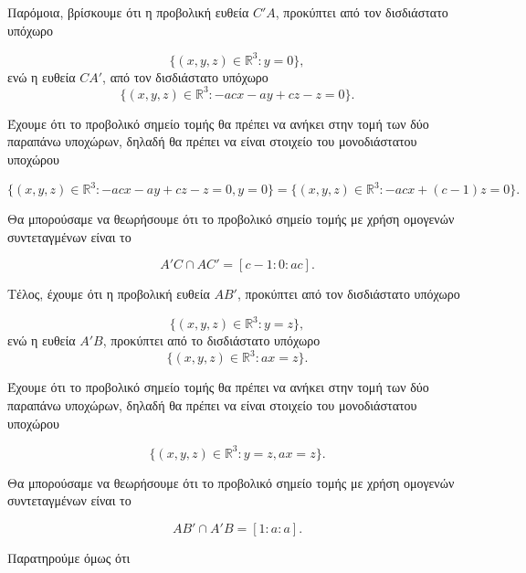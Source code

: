\documentclass[12pt, a4paper]{book}
\begin{document}
Παρόμοια, βρίσκουμε ότι η προβολική ευθεία $C'A$, προκύπτει από τον δισδιάστατο υπόχωρο

\begin{displaymath}
\{(x,y,z)\in \mathbb{R}^3: y=0\},
\end{displaymath}
ενώ η ευθεία $CA'$, από τον δισδιάστατο υπόχωρο
\begin{displaymath}
\{(x,y,z)\in \mathbb{R}^3: -acx-ay+cz-z =0\}.
\end{displaymath}

Έχουμε ότι το προβολικό σημείο τομής θα πρέπει να ανήκει στην τομή των δύο παραπάνω υποχώρων, δηλαδή θα πρέπει να είναι στοιχείο του μονοδιάστατου υποχώρου

\begin{displaymath}
\{(x,y,z)\in \mathbb{R}^3: -acx-ay+cz-z =0, y=0\}=\{(x,y,z)\in \mathbb{R}^3: -acx +(c-1)z =0\}.
\end{displaymath}

Θα μπορούσαμε να θεωρήσουμε ότι το προβολικό σημείο τομής με χρήση  ομογενών συντεταγμένων είναι το 

\begin{displaymath}
A'C \cap AC' = [c-1:0:ac].
\end{displaymath}

Τέλος, έχουμε ότι η προβολική ευθεία $ΑΒ'$, προκύπτει από τον δισδιάστατο υπόχωρο

\begin{displaymath}
\{(x,y,z)\in \mathbb{R}^3:y=z\},
\end{displaymath}
ενώ η ευθεία $A'B$, προκύπτει από το δισδιάστατο υπόχωρο 
\begin{displaymath}
\{(x,y,z)\in \mathbb{R}^3: ax=z\}.
\end{displaymath}

Έχουμε ότι το προβολικό σημείο τομής θα πρέπει να ανήκει στην τομή των δύο παραπάνω υποχώρων, δηλαδή θα πρέπει να είναι στοιχείο του μονοδιάστατου υποχώρου

\begin{displaymath}
\{(x,y,z)\in \mathbb{R}^3:y=z, ax=z\}.
\end{displaymath}

Θα μπορούσαμε να θεωρήσουμε ότι το προβολικό σημείο τομής με χρήση ομογενών συντεταγμένων είναι το 

\begin{displaymath}
AB' \cap A'B = [1:a:a].
\end{displaymath}

Παρατηρούμε όμως ότι 
\end{document}
